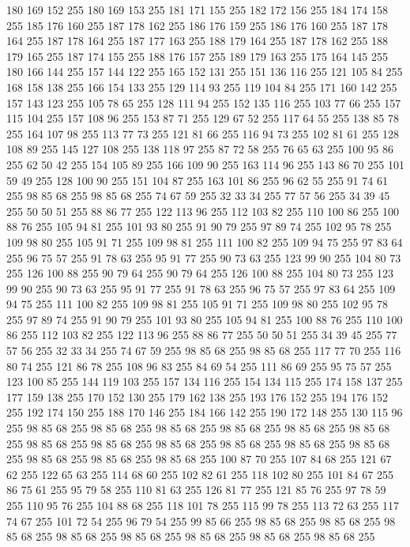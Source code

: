 180 169 152 255 180 169 153 255 181 171 155 255 182 172 156 255 184 174 158 255 185 176 160 255 187 178 162 255 186 176 159 255 186 176 160 255 187 178 164 255 187 178 164 255 187 177 163 255 188 179 164 255 187 178 162 255 188 179 165 255 187 174 155 255 188 176 157 255 189 179 163 255 175 164 145 255 180 166 144 255 157 144 122 255 165 152 131 255 151 136 116 255 121 105 84 255 168 158 138 255 166 154 133 255 129 114 93 255 119 104 84 255 171 160 142 255 157 143 123 255 105 78 65 255 128 111 94 255 152 135 116 255 103 77 66 255 157 115 104 255 157 108 96 255 153 87 71 255 129 67 52 255 117 64 55 255 138 85 78 255 164 107 98 255 113 77 73 255 121 81 66 255 116 94 73 255 102 81 61 255 128 108 89 255 145 127 108 255 138 118 97 255 87 72 58 255 76 65 63 255 100 95 86 255 62 50 42 255 154 105 89 255 166 109 90 255 163 114 96 255 143 86 70 255 101 59 49 255 128 100 90 255 151 104 87 255 163 101 86 255 96 62 55 255 91 74 61 255 98 85 68 255 98 85 68 255
74 67 59 255 32 33 34 255 77 57 56 255 34 39 45 255 50 50 51 255 88 86 77 255 122 113 96 255 112 103 82 255 110 100 86 255 100 88 76 255 105 94 81 255 101 93 80 255 91 90 79 255 97 89 74 255 102 95 78 255 109 98 80 255 105 91 71 255 109 98 81 255 111 100 82 255 109 94 75 255 97 83 64 255 96 75 57 255 91 78 63 255 95 91 77 255 90 73 63 255 123 99 90 255 104 80 73 255 126 100 88 255 90 79 64 255 90 79 64 255 126 100 88 255 104 80 73 255 123 99 90 255 90 73 63 255 95 91 77 255 91 78 63 255 96 75 57 255 97 83 64 255 109 94 75 255 111 100 82 255 109 98 81 255 105 91 71 255 109 98 80 255 102 95 78 255 97 89 74 255 91 90 79 255 101 93 80 255 105 94 81 255 100 88 76 255 110 100 86 255 112 103 82 255 122 113 96 255 88 86 77 255 50 50 51 255 34 39 45 255 77 57 56 255 32 33 34 255 74 67 59 255 98 85 68 255 98 85 68 255 117 77 70 255 116 80 74 255 121 86 78 255 108 96 83 255
84 69 54 255 111 86 69 255 95 75 57 255 123 100 85 255 144 119 103 255 157 134 116 255 154 134 115 255 174 158 137 255 177 159 138 255 170 152 130 255 179 162 138 255 193 176 152 255 194 176 152 255 192 174 150 255 188 170 146 255 184 166 142 255 190 172 148 255 130 115 96 255 98 85 68 255 98 85 68 255 98 85 68 255 98 85 68 255 98 85 68 255 98 85 68 255 98 85 68 255 98 85 68 255 98 85 68 255 98 85 68 255 98 85 68 255 98 85 68 255 98 85 68 255 98 85 68 255 98 85 68 255 100 87 70 255 107 84 68 255 121 67 62 255 122 65 63 255 114 68 60 255 102 82 61 255 118 102 80 255 101 84 67 255 86 75 61 255 95 79 58 255 110 81 63 255 126 81 77 255 121 85 76 255 97 78 59 255 110 95 76 255 104 88 68 255 118 101 78 255 115 99 78 255 113 72 63 255 117 74 67 255 101 72 54 255 96 79 54 255 99 85 66 255 98 85 68 255 98 85 68 255 98 85 68 255 98 85 68 255 98 85 68 255 98 85 68 255 98 85 68 255 98 85 68 255
